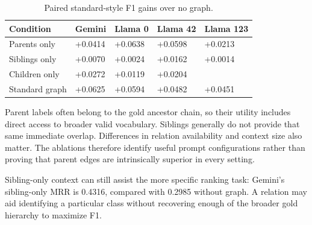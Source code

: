 \begingroup
\begin{table}[!htbp]
\setlength{\tabcolsep}{3pt}
\renewcommand{\arraystretch}{1.18}
\fontsize{8.5}{10.5}\selectfont
\renewcommand{\thetable}{7.5}
\caption{Paired standard-style F1 gains over no graph.}\label{table:7.5}
\begin{tabular}{>{\raggedright\arraybackslash}p{}>{\raggedright\arraybackslash}p{}>{\raggedright\arraybackslash}p{}>{\raggedright\arraybackslash}p{}>{\raggedright\arraybackslash}p{}}
\toprule
\textbf{Condition} & \textbf{Gemini} & \textbf{Llama 0} & \textbf{Llama 42} & \textbf{Llama 123} \\
\midrule
Parents only & +0.0414 & +0.0638 & +0.0598 & +0.0213 \\
Siblings only & +0.0070 & +0.0024 & +0.0162 & +0.0014 \\
Children only & +0.0272 & +0.0119 & +0.0204 & -0.0092 \\
Standard graph & +0.0625 & +0.0594 & +0.0482 & +0.0451 \\
\bottomrule
\end{tabular}
\end{table}
\endgroup


Parent labels often belong to the gold ancestor chain, so their utility includes direct access to broader valid vocabulary. Siblings generally do not provide that same immediate overlap. Differences in relation availability and context size also matter. The ablations therefore identify useful prompt configurations rather than proving that parent edges are intrinsically superior in every setting.


Sibling-only context can still assist the more specific ranking task: Gemini’s sibling-only MRR is 0.4316, compared with 0.2985 without graph. A relation may aid identifying a particular class without recovering enough of the broader gold hierarchy to maximize F1.


